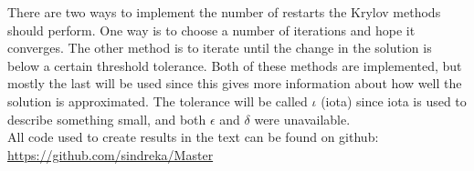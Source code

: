 \noindent There are two ways to implement the number of restarts the Krylov methods should perform. One way is to choose a number of iterations and hope it converges. The other method is to iterate until the change in the solution is below a certain threshold tolerance. Both of these methods are implemented, but mostly the last will be used since this gives more information about how well the solution is approximated. The tolerance will be called $\iota$ (iota) since iota is used to describe something small\cite{iota}, and both $\epsilon$ and $\delta$ were unavailable.\\

\noindent All code used to create results in the text can be found on github: \\
\url{https://github.com/sindreka/Master}


